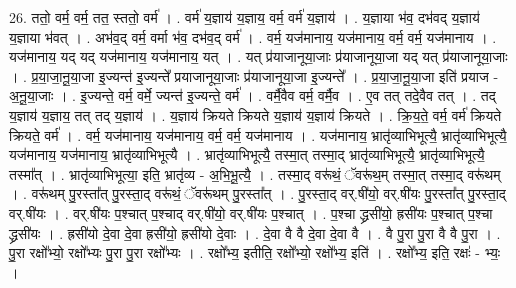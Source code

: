 \documentclass[17pt]{extarticle}
\begin{document}
26. ततो॒ वर्म॒ वर्म॒ तत॒ स्ततो॒ वर्म॑ । . वर्म॑ य॒ज्ञाय॑ य॒ज्ञाय॒ वर्म॒ वर्म॑ य॒ज्ञाय॑ । . य॒ज्ञाया भ॑व॒ दभ॑वद् य॒ज्ञाय॑ य॒ज्ञाया भ॑वत् । . अभ॑व॒द् वर्म॒ वर्मा भ॑व॒ दभ॑व॒द् वर्म॑ । . वर्म॒ यज॑मानाय॒ यज॑मानाय॒ वर्म॒ वर्म॒ यज॑मानाय । . यज॑मानाय॒ यद् यद् यज॑मानाय॒ यज॑मानाय॒ यत् । . यत् प्र॑याजानूया॒जाः प्र॑याजानूया॒जा यद् यत् प्र॑याजानूया॒जाः । . प्र॒या॒जा॒नू॒या॒जा इ॒ज्यन्त॑ इ॒ज्यन्ते᳚ प्रयाजानूया॒जाः प्र॑याजानूया॒जा इ॒ज्यन्ते᳚ । . प्र॒या॒जा॒नू॒या॒जा इति॑ प्रयाज - अ॒नू॒या॒जाः । . इ॒ज्यन्ते॒ वर्म॒ वर्मे॒ ज्यन्त॑ इ॒ज्यन्ते॒ वर्म॑ । . वर्मै॒वैव वर्म॒ वर्मै॒व । . ए॒व तत् तदे॒वैव तत् । . तद् य॒ज्ञाय॑ य॒ज्ञाय॒ तत् तद् य॒ज्ञाय॑ । . य॒ज्ञाय॑ क्रियते क्रियते य॒ज्ञाय॑ य॒ज्ञाय॑ क्रियते । . क्रि॒य॒ते॒ वर्म॒ वर्म॑ क्रियते क्रियते॒ वर्म॑ । . वर्म॒ यज॑मानाय॒ यज॑मानाय॒ वर्म॒ वर्म॒ यज॑मानाय । . यज॑मानाय॒ भ्रातृ॑व्याभिभूत्यै॒ भ्रातृ॑व्याभिभूत्यै॒ यज॑मानाय॒ यज॑मानाय॒ भ्रातृ॑व्याभिभूत्यै । . भ्रातृ॑व्याभिभूत्यै॒ तस्मा॒त् तस्मा॒द् भ्रातृ॑व्याभिभूत्यै॒ भ्रातृ॑व्याभिभूत्यै॒ तस्मा᳚त् । . भ्रातृ॑व्याभिभूत्या॒ इति॒ भ्रातृ॑व्य - अ॒भि॒भू॒त्यै॒ । . तस्मा॒द् वरू॑थं॒ ॅवरू॑थ॒म् तस्मा॒त् तस्मा॒द् वरू॑थम् । . वरू॑थम् पु॒रस्ता᳚त् पु॒रस्ता॒द् वरू॑थं॒ ॅवरू॑थम् पु॒रस्ता᳚त् । . पु॒रस्ता॒द् वर्.षी॑यो॒ वर्.षी॑यः पु॒रस्ता᳚त् पु॒रस्ता॒द् वर्.षी॑यः । . वर्.षी॑यः प॒श्चात् प॒श्चाद् वर्.षी॑यो॒ वर्.षी॑यः प॒श्चात् । . प॒श्चा द्ध्रसी॑यो॒ ह्रसी॑यः प॒श्चात् प॒श्चा द्ध्रसी॑यः । . ह्रसी॑यो दे॒वा दे॒वा ह्रसी॑यो॒ ह्रसी॑यो दे॒वाः । . दे॒वा वै वै दे॒वा दे॒वा वै । . वै पु॒रा पु॒रा वै वै पु॒रा । . पु॒रा रक्षो᳚भ्यो॒ रक्षो᳚भ्यः पु॒रा पु॒रा रक्षो᳚भ्यः । . रक्षो᳚भ्य॒ इतीति॒ रक्षो᳚भ्यो॒ रक्षो᳚भ्य॒ इति॑ । . रक्षो᳚भ्य॒ इति॒ रक्षः॑ - भ्यः॒ । \newline
\end{document}
